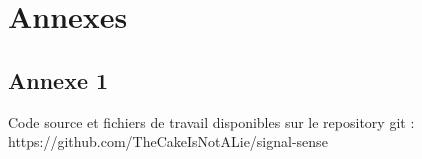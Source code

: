 \chapter*{Annexes}



\section*{Annexe 1}
Code source et fichiers de travail disponibles sur le repository git : https://github.com/TheCakeIsNotALie/signal-sense





